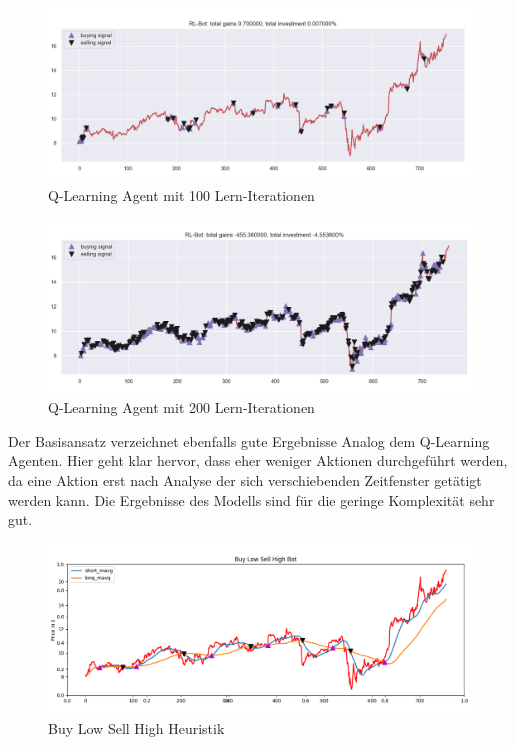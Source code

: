 \begin{figure}[H]
	\centering
	\includegraphics[scale=0.5]{../Topic3-TradingBot/plots/100iter-RL-bot.png} \caption{Q-Learning Agent mit 100 Lern-Iterationen}
\end{figure}

\begin{figure}[H]
	\centering
	\includegraphics[scale=0.5]{../Topic3-TradingBot/plots/200iter-RL-bot.png} \caption{Q-Learning Agent mit 200 Lern-Iterationen}
\end{figure}

Der Basisansatz verzeichnet ebenfalls gute Ergebnisse Analog dem Q-Learning Agenten. Hier geht klar hervor, dass eher weniger Aktionen durchgeführt werden, da eine Aktion erst nach Analyse der sich verschiebenden Zeitfenster getätigt werden kann. Die Ergebnisse des Modells sind für die geringe Komplexität sehr gut.

\begin{figure}[H]
	\centering
	\includegraphics[scale=0.5]{../Topic3-TradingBot/plots/BLSH-bot.png} \caption{Buy Low Sell High Heuristik}
\end{figure}
